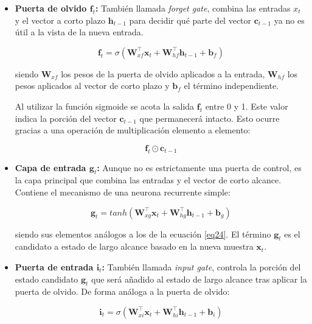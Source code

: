 \begin{itemize}	
	\item \textbf{Puerta de olvido $\textbf{f}_t$:} También llamada \textit{forget gate}, combina las entradas $x_t$ y el vector a corto plazo $\textbf{h}_{t-1}$ para decidir qué parte del vector $\textbf{c}_{t-1}$ ya no es útil a la vista de la nueva entrada.
	
	\begin{equation}
		\textbf{f}_t = \sigma(\textbf{W}_{xf}^\top \textbf{x}_t + \textbf{W}_{hf}^\top \textbf{h}_{t-1} + \textbf{b}_f) 
		\label{eq24}
	\end{equation}
	
	siendo $\textbf{W}_{xf}$ los pesos de la puerta de olvido aplicados a la entrada, $\textbf{W}_{hf}$ los pesos aplicados al vector de corto plazo y $\textbf{b}_f$ el término independiente.
	
	Al utilizar la función sigmoide se acota la salida $\textbf{f}_t$ entre 0 y 1. Este valor indica la porción del vector $\textbf{c}_{t-1}$ que permanecerá intacto. Esto ocurre gracias a una operación de multiplicación elemento a elemento:
	
	\begin{equation}
		\textbf{f}_t \odot \textbf{c}_{t-1}
	\end{equation}
	
	
	\item \textbf{Capa de entrada $\textbf{g}_t$:} Aunque no es estrictamente una puerta de control, es la capa principal que combina las entradas y el vector de corto alcance. Contiene el mecanismo de una neurona recurrente simple:
	
	\begin{equation}
		\textbf{g}_t = tanh(\textbf{W}_{xg}^\top \textbf{x}_t + \textbf{W}_{hg}^\top \textbf{h}_{t-1} + \textbf{b}_g)
	\end{equation}
	
	siendo sus elementos análogos a los de la ecuación \ref{eq24}. El término $\textbf{g}_t$ es el candidato a estado de largo alcance basado en la nueva muestra $\textbf{x}_t$.
	
	\item \textbf{Puerta de entrada $\textbf{i}_t$:} También llamada \textit{input gate}, controla la porción del estado candidato $\textbf{g}_t$ que será añadido al estado de largo alcance tras aplicar la puerta de olvido. De forma análoga a la puerta de olvido:
	
	\begin{equation}
		\textbf{i}_t = \sigma(\textbf{W}_{xi}^\top \textbf{x}_t + \textbf{W}_{hi}^\top \textbf{h}_{t-1} + \textbf{b}_i) 
	\end{equation}
	

\end{itemize}
